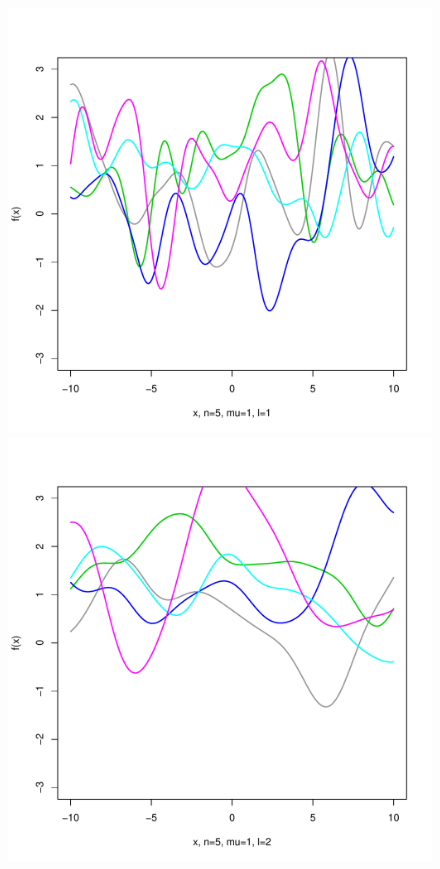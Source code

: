 \documentclass[12pt,letterpaper]{article}
\begin{document}
\begin{figure}
\begin{center}
\includegraphics[scale=0.2]{hw321/n5-m1-l1.pdf}
\includegraphics[scale=0.2]{hw321/n5-m1-l2.pdf}

\end{center}
\end{figure}
\end{document}
